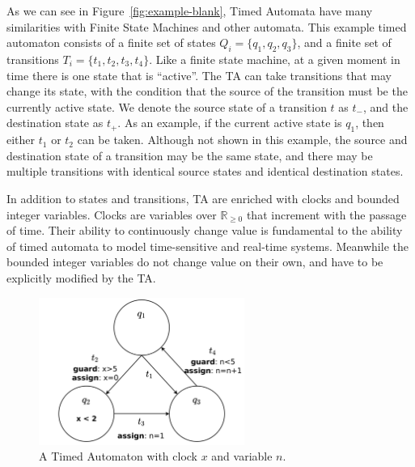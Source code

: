 \documentclass[a4paper,11pt]{report}
\theoremstyle{definition}
\begin{document}
As we can see in Figure~\ref{fig:example-blank}, Timed Automata have many
similarities with Finite State Machines and other automata. This example timed
automaton consists of a finite set of states $Q_{i} = \{q_{1},q_{2},q_{3}\}$,
and a finite set of transitions $T_{i} = \{t_{1},t_{2},t_{3},t_{4}\}$. Like a
finite state machine, at a given moment in time there is one state that is
``active''. The TA can take transitions that may change its state, with the
condition that the source of the transition must be the currently active state.
We denote the source state of a transition $t$ as $t_{-}$, and the destination
state as $t_{+}$. As an example, if the current active state is $q_{1}$, then
either $t_{1}$ or $t_{2}$ can be taken. Although not shown in this example, the
source and destination state of a transition may be the same state, and there
may be multiple transitions with identical source states and identical
destination states.

In addition to states and transitions, TA are enriched with clocks and bounded
integer variables. Clocks are variables over $\mathbb{R}_{\geq 0}$ that
increment with the passage of time. Their ability to continuously change value
is fundamental to the ability of timed automata to model time-sensitive and
real-time systems. Meanwhile the bounded integer variables do not change value
on their own, and have to be explicitly modified by the TA.

\begin{figure}[h]
  \centering
  \includegraphics[width=0.6\textwidth]{minTA-big}
  \caption{A Timed Automaton with clock $x$ and variable $n$.}
  \label{fig:example-big}
\end{figure}
\end{document}
